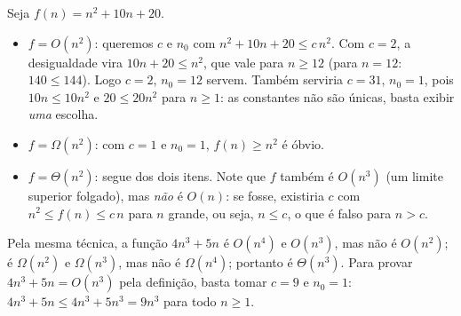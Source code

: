 \begin{figura}[A função $f(n)=n^2+10n+20$ fica ``ensanduichada'' entre $1\cdot n^2$ e $2\cdot n^2$ a partir de $n_0=12$. A curva de baixo prova $f=\Omega(n^2)$, a de cima prova $f=O(n^2)$ e as duas juntas provam $f=\Theta(n^2)$.\label{fig:otheta}]
\end{figura}

\begin{exemplo}\label{ex:otheta}
Seja $f(n)=n^2+10n+20$.
\begin{itemize}
  \item $f=O(n^2)$: queremos $c$ e $n_0$ com $n^2+10n+20\le c\,n^2$. Com $c=2$, a desigualdade vira $10n+20\le n^2$, que vale para $n\ge12$ (para $n=12$: $140\le144$). Logo $c=2$, $n_0=12$ servem. Também serviria $c=31$, $n_0=1$, pois $10n\le10n^2$ e $20\le20n^2$ para $n\ge1$: as constantes não são únicas, basta exibir \emph{uma} escolha.
  \item $f=\Omega(n^2)$: com $c=1$ e $n_0=1$, $f(n)\ge n^2$ é óbvio.
  \item $f=\Theta(n^2)$: segue dos dois itens. Note que $f$ também é $O(n^3)$ (um limite superior folgado), mas \emph{não} é $O(n)$: se fosse, existiria $c$ com $n^2\le f(n)\le c\,n$ para $n$ grande, ou seja, $n\le c$, o que é falso para $n>c$.
\end{itemize}
\end{exemplo}

\begin{exemplo}
Pela mesma técnica, a função $4n^3+5n$ é $O(n^4)$ e $O(n^3)$, mas não é $O(n^2)$; é $\Omega(n^2)$ e $\Omega(n^3)$, mas não é $\Omega(n^4)$; portanto é $\Theta(n^3)$. Para provar $4n^3+5n=O(n^3)$ pela definição, basta tomar $c=9$ e $n_0=1$: $4n^3+5n\le4n^3+5n^3=9n^3$ para todo $n\ge1$.
\end{exemplo}

